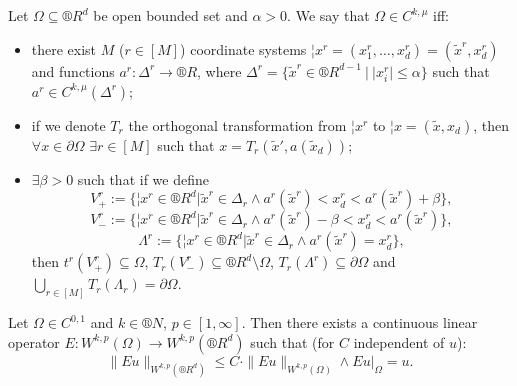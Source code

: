 \documentclass[12pt]{article}					%
\begin{document}
\begin{definice}
	Let $\Omega \subseteq ®R^d$ be open bounded set and $\alpha > 0$. We say that $\Omega \in C^{k, \mu}$ iff:

	\begin{itemize}
		\item there exist $M$ ($r \in [M]$) coordinate systems $¦x^r = (x_1^r, …, x_d^r) = (\tilde x^r, x_d^r)$ and functions $a^r: \Delta^r \rightarrow ®R$, where $\Delta^r = \{\tilde x^r \in ®R^{d - 1}\ |\ |x_i^r| ≤ \alpha\}$ such that $a^r \in C^{k, \mu}(\Delta^r)$;
		\item if we denote $T_r$ the orthogonal transformation from $¦x^r$ to $¦x = (\tilde x, x_d)$, then $\forall x \in \partial\Omega$ $\exists r \in [M]$ such that $x = T_r(\tilde x', a(\tilde x_d))$;
		\item $\exists \beta > 0$ such that if we define
			$$ V_+^r := \{¦x^r \in ®R^d | \tilde x^r \in \Delta_r \land a^r(\tilde x^r) < x_d^r < a^r(\tilde x^r) + \beta\}, $$
			$$ V_-^r := \{¦x^r \in ®R^d | \tilde x^r \in \Delta_r \land a^r(\tilde x^r) - \beta < x_d^r < a^r(\tilde x^r)\}, $$
			$$ \Lambda^r := \{¦x^r \in ®R^d | \tilde x^r \in \Delta_r \land a^r(\tilde x^r) = x_d^r\}, $$
			then $t^r(V_+^r) \subseteq \Omega$, $T_r(V_-^r) \subseteq ®R^d \setminus \Omega$, $T_r(\Lambda^r) \subseteq \partial \Omega$ and $\bigcup_{r\in[M]} T_r(\Lambda_r) = \partial \Omega$.
	\end{itemize}
\end{definice}

\begin{veta}
	Let $\Omega \in C^{0, 1}$ and $k \in ®N$, $p \in [1, ∞]$. Then there exists a continuous linear operator $E: W^{k, p}(\Omega) \rightarrow W^{k, p}(®R^d)$ such that (for $C$ independent of $u$):
	$$ \|E u\|_{W^{k, p}(®R^d)} ≤ C·\|E u\|_{W^{k, p}(\Omega)} \land E u |_\Omega = u. $$
\end{veta}
\end{document}
